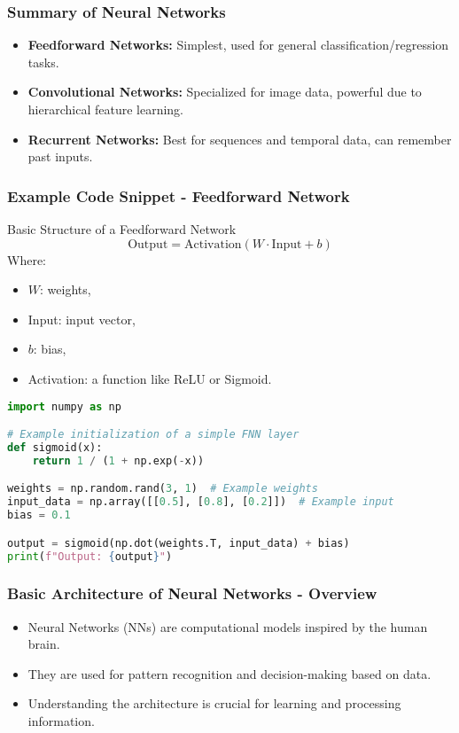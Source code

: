 \documentclass[aspectratio=169]{beamer}
\begin{document}
\begin{frame}[fragile]
    \frametitle{Summary of Neural Networks}
    \begin{itemize}
        \item \textbf{Feedforward Networks:} Simplest, used for general classification/regression tasks.
        \item \textbf{Convolutional Networks:} Specialized for image data, powerful due to hierarchical feature learning.
        \item \textbf{Recurrent Networks:} Best for sequences and temporal data, can remember past inputs.
    \end{itemize}
\end{frame}

\begin{frame}[fragile]
    \frametitle{Example Code Snippet - Feedforward Network}
    \begin{block}{Basic Structure of a Feedforward Network}
        \begin{equation}
            \text{Output} = \text{Activation}(W \cdot \text{Input} + b)
        \end{equation}
        Where:
        \begin{itemize}
            \item \(W\): weights,
            \item Input: input vector,
            \item \(b\): bias,
            \item Activation: a function like ReLU or Sigmoid.
        \end{itemize}
    \end{block}
    \begin{lstlisting}[language=Python]
import numpy as np

# Example initialization of a simple FNN layer
def sigmoid(x):
    return 1 / (1 + np.exp(-x))

weights = np.random.rand(3, 1)  # Example weights
input_data = np.array([[0.5], [0.8], [0.2]])  # Example input
bias = 0.1

output = sigmoid(np.dot(weights.T, input_data) + bias)
print(f"Output: {output}")
    \end{lstlisting}
\end{frame}

\begin{frame}[fragile]
    \frametitle{Basic Architecture of Neural Networks - Overview}
    \begin{itemize}
        \item Neural Networks (NNs) are computational models inspired by the human brain.
        \item They are used for pattern recognition and decision-making based on data.
        \item Understanding the architecture is crucial for learning and processing information.
    \end{itemize}
\end{frame}
\end{document}
